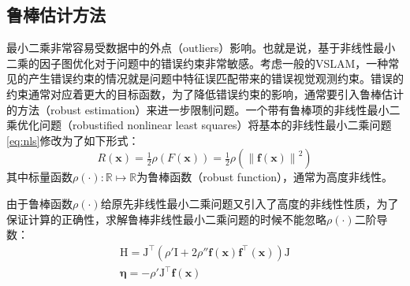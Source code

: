 \subsection{鲁棒估计方法}

最小二乘非常容易受数据中的外点（outliers）影响。也就是说，基于非线性最小二乘的因子图优化对于问题中的错误约束非常敏感。考虑一般的VSLAM，一种常见的产生错误约束的情况就是问题中特征误匹配带来的错误视觉观测约束。错误的约束通常对应着更大的目标函数，为了降低错误约束的影响，通常要引入鲁棒估计的方法（robust estimation）来进一步限制问题。一个带有鲁棒项的非线性最小二乘优化问题（robustified nonlinear least squares）将基本的非线性最小二乘问题\eqref{eq:nls}修改为了如下形式：
\begin{equation}
    R(\bm{x}) = \tfrac{1}{2} \rho(F(\bm{x}))
              = \tfrac{1}{2} \rho \left( \left\| \bm{f}(\bm{x}) \right\|^2 \right)
\label{eq:rnls}
\end{equation}
其中标量函数$\rho(\cdot):\mathbb{R}\mapsto\mathbb{R}$为鲁棒函数（robust function），通常为高度非线性。

由于鲁棒函数$\rho(\cdot)$给原先非线性最小二乘问题又引入了高度的非线性性质，为了保证计算的正确性，求解鲁棒非线性最小二乘问题的时候不能忽略$\rho(\cdot)$二阶导数\citep{triggs1999bundle}：
\begin{equation}
\begin{gathered}
    \mathrm{H} = \mathrm{J}^\top
                 \left(
                     \rho'\mathrm{I} + 2\rho'' \bm{f}(\bm{x}) \bm{f}^\top(\bm{x})
                 \right)
                 \mathrm{J} \\
    \bm{\eta} = -\rho' \mathrm{J}^\top \bm{f}(\bm{x})
\end{gathered}
\label{eq:rnormal_eq}
\end{equation}

